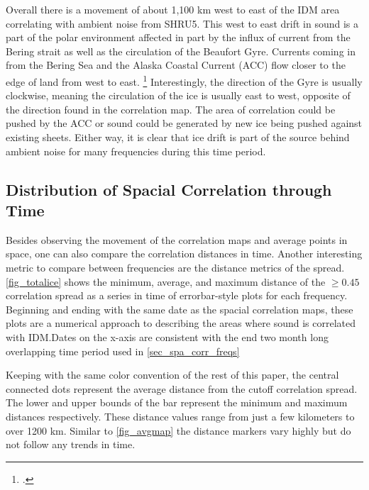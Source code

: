 Overall there is a movement of about 1,100 km west to east of the IDM area correlating with ambient noise from SHRU5. This west to east drift in sound is a part of the polar environment affected in part by the influx of current from the Bering strait as well as the circulation of the Beaufort Gyre. Currents coming in from the Bering Sea and the Alaska Coastal Current (ACC) flow closer to the edge of land from west to east. \footcite[]{Weingartner2005} Interestingly, the direction of the Gyre is usually clockwise, meaning the circulation of the ice is usually east to west, opposite of the direction found in the correlation map. The area of correlation could be pushed by the ACC or sound could be generated by new ice being pushed against existing sheets. Either way, it is clear that ice drift is part of the source behind ambient noise for many frequencies during this time period. 




\subsection{Distribution of Spacial Correlation through Time}

Besides observing the movement of the correlation maps and average points in space, one can also compare the correlation distances in time. Another interesting metric to compare between frequencies are the distance metrics of the spread. \autoref{fig_totalice} shows the minimum, average, and maximum distance of the $\geq 0.45$ correlation spread as a series in time of errorbar-style plots for each frequency. Beginning and ending with the same date as the spacial correlation maps, these plots are a numerical approach to describing the areas where sound is correlated with IDM.Dates on the x-axis are consistent with the end two month long overlapping time period used in \autoref{sec_spa_corr_freqs}

Keeping with the same color convention of the rest of this paper, the central connected dots represent the average distance from the cutoff correlation spread. The lower and upper bounds of the bar represent the minimum and maximum distances respectively. These distance values range from just a few kilometers to over 1200 km. Similar to \autoref{fig_avgmap} the distance markers vary highly but do not follow any trends in time. 

